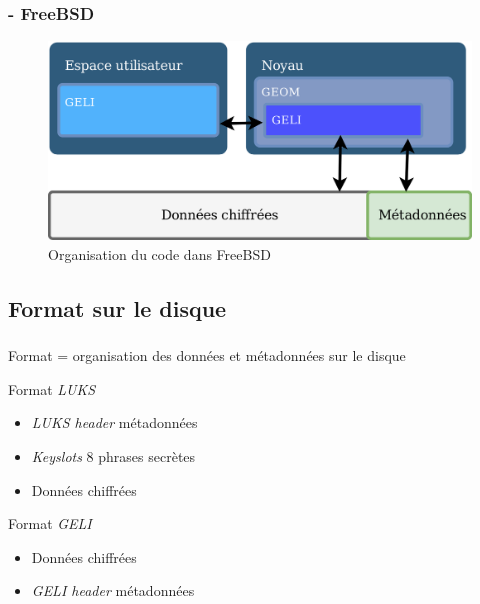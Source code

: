\begin{frame}
  \frametitle{\insertsubsectionhead{} - \textbf{FreeBSD}}
  \begin{figure}
    \includegraphics[width=\textwidth]{etat_art/organisation_freebsd}
    \caption{Organisation du code dans FreeBSD}
  \end{figure}
\end{frame}

\subsection{Format sur le disque}

\begin{frame}
  \frametitle{\insertsubsectionhead{}}
  \begin{center}
    Format = organisation des données et métadonnées sur le disque
  \end{center}
  \begin{block}{Format \textit{LUKS}}
    \begin{itemize}
    \item \textit{LUKS header} \textrightarrow{} métadonnées
    \item \textit{Keyslots} \textrightarrow{} 8 phrases secrètes
    \item Données chiffrées
    \end{itemize}
  \end{block}
  \begin{block}{Format \textit{GELI}}
    \begin{itemize}
    \item Données chiffrées
    \item \textit{GELI header} \textrightarrow{} métadonnées
    \end{itemize}
  \end{block}
\end{frame}

